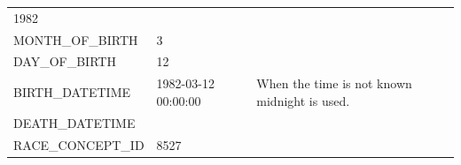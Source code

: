\documentclass[11pt]{book}
\theoremstyle{definition}
\theoremstyle{definition}
\theoremstyle{definition}
\theoremstyle{remark}
\begin{document}
\begin{longtable}[]{@{}lll@{}}
\begin{minipage}[t]{0.15\columnwidth}
1982\strut
\end{minipage} & \begin{minipage}[t]{0.49\columnwidth}\raggedright
\strut
\end{minipage}\tabularnewline
\begin{minipage}[t]{0.28\columnwidth}\raggedright
MONTH\_OF\_BIRTH\strut
\end{minipage} & \begin{minipage}[t]{0.15\columnwidth}\raggedright
3\strut
\end{minipage} & \begin{minipage}[t]{0.49\columnwidth}\raggedright
\strut
\end{minipage}\tabularnewline
\begin{minipage}[t]{0.28\columnwidth}\raggedright
DAY\_OF\_BIRTH\strut
\end{minipage} & \begin{minipage}[t]{0.15\columnwidth}\raggedright
12\strut
\end{minipage} & \begin{minipage}[t]{0.49\columnwidth}\raggedright
\strut
\end{minipage}\tabularnewline
\begin{minipage}[t]{0.28\columnwidth}\raggedright
BIRTH\_DATETIME\strut
\end{minipage} & \begin{minipage}[t]{0.15\columnwidth}\raggedright
1982-03-12 00:00:00\strut
\end{minipage} & \begin{minipage}[t]{0.49\columnwidth}\raggedright
When the time is not known midnight is used.\strut
\end{minipage}\tabularnewline
\begin{minipage}[t]{0.28\columnwidth}\raggedright
DEATH\_DATETIME\strut
\end{minipage} & \begin{minipage}[t]{0.15\columnwidth}\raggedright
\strut
\end{minipage} & \begin{minipage}[t]{0.49\columnwidth}\raggedright
\strut
\end{minipage}\tabularnewline
\begin{minipage}[t]{0.28\columnwidth}\raggedright
RACE\_CONCEPT\_ID\strut
\end{minipage} & \begin{minipage}[t]{0.15\columnwidth}\raggedright
8527\strut
\end{minipage} & \begin{minipage}[t]{0.49\columnwidth}\raggedright

\end{minipage}
\end{longtable}
\end{document}

